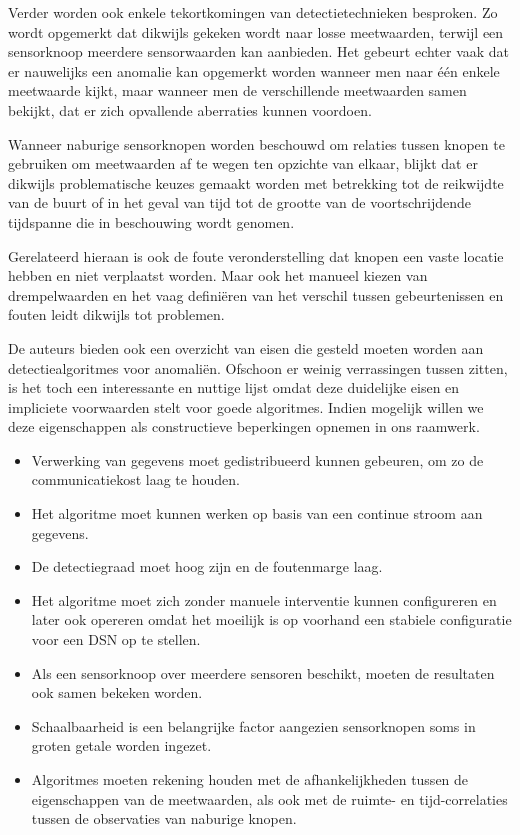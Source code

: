 Verder worden ook enkele tekortkomingen van detectietechnieken besproken. Zo
wordt opgemerkt dat dikwijls gekeken wordt naar losse meetwaarden, terwijl een
sensorknoop meerdere sensorwaarden kan aanbieden. Het gebeurt echter vaak dat
er nauwelijks een anomalie kan opgemerkt worden wanneer men naar \'e\'en enkele
meetwaarde kijkt, maar wanneer men de verschillende meetwaarden samen bekijkt,
dat er zich opvallende aberraties kunnen voordoen.

Wanneer naburige sensorknopen worden beschouwd om relaties tussen knopen te
gebruiken om meetwaarden af te wegen ten opzichte van elkaar, blijkt dat er
dikwijls problematische keuzes gemaakt worden met betrekking tot de reikwijdte
van de buurt of in het geval van tijd tot de grootte van de voortschrijdende
tijdspanne die in beschouwing wordt genomen.

Gerelateerd hieraan is ook de foute veronderstelling dat knopen een vaste
locatie hebben en niet verplaatst worden. Maar ook het manueel kiezen van
drempelwaarden en het vaag defini\"eren van het verschil tussen gebeurtenissen
en fouten leidt dikwijls tot problemen.

De auteurs bieden ook een overzicht van eisen die gesteld moeten worden aan
detectiealgoritmes voor anomali\"en. Ofschoon er weinig verrassingen tussen
zitten, is het toch een interessante en nuttige lijst omdat deze duidelijke
eisen en impliciete voorwaarden stelt voor goede algoritmes. Indien mogelijk
willen we deze eigenschappen als constructieve beperkingen opnemen in ons
raamwerk.

\begin{itemize}

  \item Verwerking van gegevens moet gedistribueerd kunnen gebeuren, om zo de
  communicatiekost laag te houden.

  \item Het algoritme moet kunnen werken op basis van een continue stroom aan
  gegevens.

  \item De detectiegraad moet hoog zijn en de foutenmarge laag.

  \item Het algoritme moet zich zonder manuele interventie kunnen configureren
  en later ook opereren omdat het moeilijk is op voorhand een stabiele
  configuratie voor een DSN op te stellen.

  \item Als een sensorknoop over meerdere sensoren beschikt, moeten de
  resultaten ook samen bekeken worden.

  \item Schaalbaarheid is een belangrijke factor aangezien sensorknopen soms in
  groten getale worden ingezet.

  \item Algoritmes moeten rekening houden met de afhankelijkheden tussen de
  eigenschappen van de meetwaarden, als ook met de ruimte- en tijd-correlaties
  tussen de observaties van naburige knopen.

\end{itemize}

